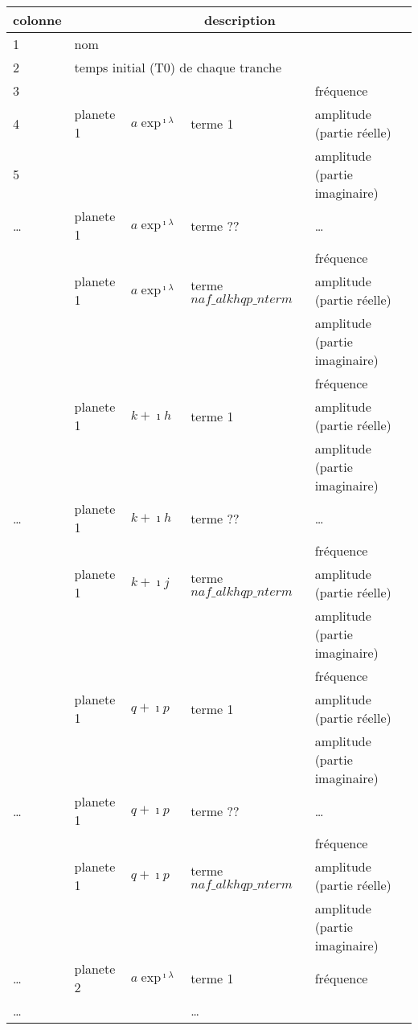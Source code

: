 \documentclass[11pt]{article}
\begin{document}
\begin{tabularx}{\textwidth}{|l|l|l|l|X|}
 \hline
 colonne &      \multicolumn{4}{c|}{description} \\ \hline
1  &    \multicolumn{4}{l|}{nom} \\ \hline
2  &    \multicolumn{4}{l|}{temps initial (T0) de chaque tranche} \\ \hline
3 & &   & & fr\'equence\\
4 &planete 1 &$a\exp^{\imath\lambda}$& terme 1 & amplitude (partie r\'eelle)\\
5 & &   & &amplitude (partie imaginaire)\\ \hline
\dots & planete 1 &$a\exp^{\imath\lambda}$& terme ?? &\dots \\ \hline
 & &   & &fr\'equence\\
 &planete 1 & $a\exp^{\imath\lambda}$ & terme $naf\_alkhqp\_nterm$ & amplitude (partie r\'eelle)\\
 & &   & &amplitude (partie imaginaire)\\ \hline
 & &   & & fr\'equence\\
 &planete 1 &$k+\imath h$& terme 1 & amplitude (partie r\'eelle)\\
 & &   & &amplitude (partie imaginaire)\\ \hline
\dots & planete 1 &$k+\imath h$& terme ?? &\dots \\ \hline
 & &   & &fr\'equence\\
 &planete 1 & $k+\imath j$ & terme $naf\_alkhqp\_nterm$ & amplitude (partie r\'eelle)\\
 & &   & &amplitude (partie imaginaire)\\ \hline
& &   & & fr\'equence\\
 &planete 1 &$q+\imath p$& terme 1 & amplitude (partie r\'eelle)\\
 & &   & &amplitude (partie imaginaire)\\ \hline
\dots & planete 1 &$q+\imath p$& terme ?? &\dots \\ \hline
 & &   & &fr\'equence\\
 &planete 1 & $q+\imath p$ & terme $naf\_alkhqp\_nterm$ & amplitude (partie r\'eelle)\\
 & &   & &amplitude (partie imaginaire)\\ \hline
\dots & planete 2 &$a\exp^{\imath\lambda}$& terme 1 &fr\'equence \\ \hline
\dots & & & \dots &\\\hline
\end{tabularx}
\end{document}
